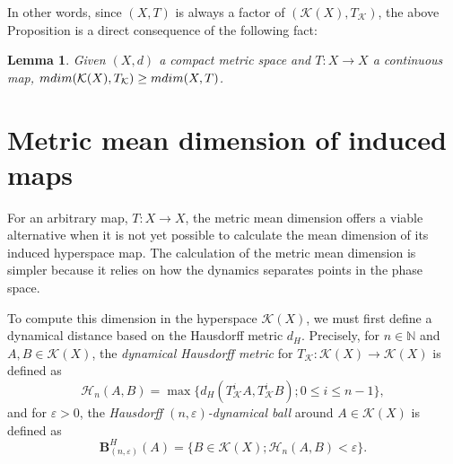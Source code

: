 \documentclass[sn-mathphys-num]{sn-jnl}%
\theoremstyle{thmstyleone}%
\newtheorem{lemma}{Lemma}
\theoremstyle{thmstyletwo}%
\theoremstyle{thmstylethree}%
\newcommand*\induce[1]{#1_\mathcal{K}}
\newcommand*\hyp[1]{\mathcal{#1}}
\begin{document}
In other words, since $(X, T)$ is always a factor of $(\hyp{K}(X), \induce{T})$, the above Proposition is a direct consequence of the following fact:\\

\begin{lemma}
    Given $(X, d)$ a compact metric space and $T: X \to X$ a continuous map, $\emph{mdim}(\hyp{K}(X), \induce{T}) \geq \emph{mdim}(X, T)$.
\end{lemma}



\section{Metric mean dimension of induced maps}\label{sec:metric-mean-dim-induced}

For an arbitrary map, $T: X \to X$, the metric mean dimension offers a viable alternative when it is not yet possible to calculate the mean dimension of its induced hyperspace map. The calculation of the metric mean dimension is simpler because it relies on how the dynamics separates points in the phase space.

To compute this dimension in the hyperspace $\hyp{K}(X)$, we must first define a dynamical distance based on the Hausdorff metric $d_H$. Precisely, for $n \in \mathbb{N}$ and $A, B \in \hyp{K}(X)$, the \emph{dynamical Hausdorff metric} for $\induce{T}: \hyp{K}(X) \to \hyp{K}(X)$ is defined as
\begin{equation*}
    \mathcal{H}_n(A, B) = \max\{ d_H(\induce{T}^iA, \induce{T}^iB); 0 \leq i \leq n - 1\},
\end{equation*}
and for $\varepsilon > 0$, the \emph{Hausdorff $(n, \varepsilon)$-dynamical ball} around $A \in \hyp{K}(X)$ is defined as
\begin{equation*}
    \mathbf{B}^H_{(n, \varepsilon)}(A) = \{B \in \hyp{K}(X); \mathcal{H}_n(A, B) < \varepsilon\}.
\end{equation*}
\end{document}
